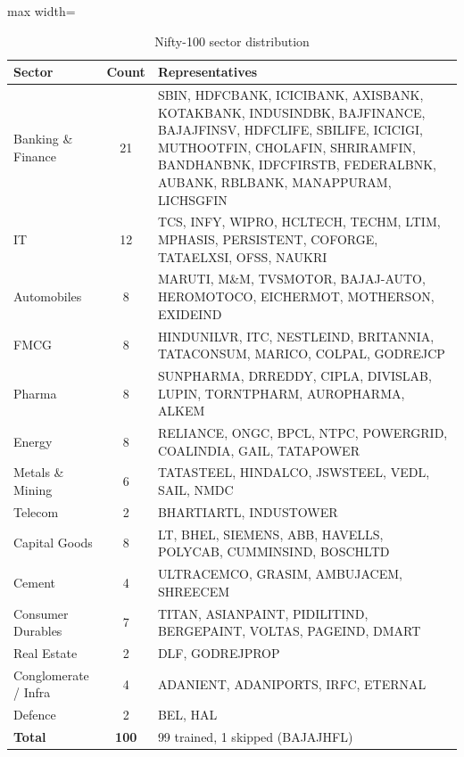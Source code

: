 \begin{table}[H]
\centering
\caption{Nifty-100 sector distribution}
\label{tab:universe_sectors}
\renewcommand{\arraystretch}{1.3}
\begin{adjustbox}{max width=\textwidth}
\begin{tabular}{l c p{9cm}}
\toprule
\textbf{Sector} & \textbf{Count} & \textbf{Representatives} \\
\midrule
Banking \& Finance   & 21 & SBIN, HDFCBANK, ICICIBANK, AXISBANK, KOTAKBANK, INDUSINDBK, BAJFINANCE, BAJAJFINSV, HDFCLIFE, SBILIFE, ICICIGI, MUTHOOTFIN, CHOLAFIN, SHRIRAMFIN, BANDHANBNK, IDFCFIRSTB, FEDERALBNK, AUBANK, RBLBANK, MANAPPURAM, LICHSGFIN \\
IT                   & 12 & TCS, INFY, WIPRO, HCLTECH, TECHM, LTIM, MPHASIS, PERSISTENT, COFORGE, TATAELXSI, OFSS, NAUKRI \\
Automobiles          & 8  & MARUTI, M\&M, TVSMOTOR, BAJAJ-AUTO, HEROMOTOCO, EICHERMOT, MOTHERSON, EXIDEIND \\
FMCG                 & 8  & HINDUNILVR, ITC, NESTLEIND, BRITANNIA, TATACONSUM, MARICO, COLPAL, GODREJCP \\
Pharma               & 8  & SUNPHARMA, DRREDDY, CIPLA, DIVISLAB, LUPIN, TORNTPHARM, AUROPHARMA, ALKEM \\
Energy               & 8  & RELIANCE, ONGC, BPCL, NTPC, POWERGRID, COALINDIA, GAIL, TATAPOWER \\
Metals \& Mining     & 6  & TATASTEEL, HINDALCO, JSWSTEEL, VEDL, SAIL, NMDC \\
Telecom              & 2  & BHARTIARTL, INDUSTOWER \\
Capital Goods        & 8  & LT, BHEL, SIEMENS, ABB, HAVELLS, POLYCAB, CUMMINSIND, BOSCHLTD \\
Cement               & 4  & ULTRACEMCO, GRASIM, AMBUJACEM, SHREECEM \\
Consumer Durables    & 7  & TITAN, ASIANPAINT, PIDILITIND, BERGEPAINT, VOLTAS, PAGEIND, DMART \\
Real Estate          & 2  & DLF, GODREJPROP \\
Conglomerate / Infra & 4  & ADANIENT, ADANIPORTS, IRFC, ETERNAL \\
Defence              & 2  & BEL, HAL \\
\midrule
\textbf{Total}       & \textbf{100} & 99 trained, 1 skipped (BAJAJHFL) \\
\bottomrule
\end{tabular}
\end{adjustbox}
\end{table}

